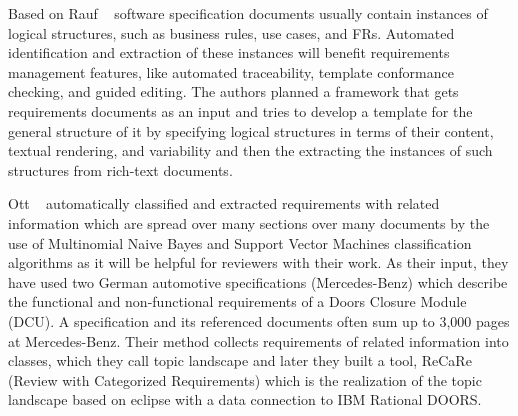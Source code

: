 Based on Rauf \etal~\cite{Rauf:2011} software specification documents usually
contain instances of logical structures, such as business rules, use cases, and
FRs. Automated identification and extraction of these
instances will benefit requirements management features, like automated
traceability, template conformance checking, and guided editing. The authors
planned a framework that gets requirements documents as an input and tries to
develop a template for the general structure of it by specifying logical
structures in terms of their content, textual rendering, and variability and
then the extracting the instances of such structures from rich-text documents.

Ott \etal~\cite{Ott:2013} automatically classified and extracted requirements
with related information which are spread over many sections over many documents
by the use of Multinomial Naive Bayes and Support Vector Machines classification
algorithms as it will be helpful for reviewers with their work. As their input,
they have used two German automotive specifications (Mercedes-Benz) which
describe the functional and non-functional requirements of a Doors Closure
Module (DCU). A specification and its referenced documents often sum up to 3,000
pages at Mercedes-Benz. Their method collects requirements of related
information into classes, which they call topic landscape and later they built a
tool, ReCaRe (Review with Categorized Requirements) which is the realization of
the topic landscape based on eclipse with a data connection to IBM Rational
DOORS.





